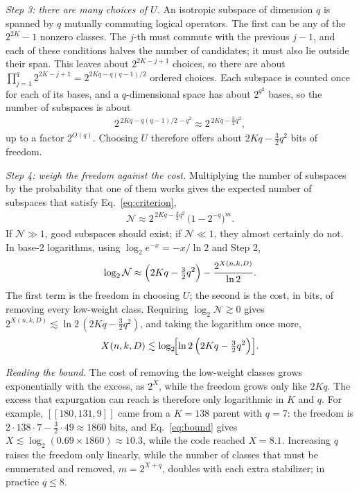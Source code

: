 \documentclass[reprint,pra,superscriptaddress,nofootinbib]{revtex4-2}
\begin{document}
\emph{Step 3: there are many choices of $U$.} An isotropic subspace of dimension $q$ is spanned by $q$ mutually
commuting logical operators. The first can be any of the $2^{2K}-1$ nonzero classes. The $j$-th must commute with the
previous $j-1$, and each of these conditions halves the number of candidates; it must also lie outside their span. This
leaves about $2^{2K-j+1}$ choices, so there are about $\prod_{j=1}^{q}2^{2K-j+1}=2^{2Kq-q(q-1)/2}$ ordered choices.
Each subspace is counted once for each of its bases, and a $q$-dimensional space has about $2^{q^2}$ bases, so the number
of subspaces is about
\begin{align}
2^{\,2Kq-q(q-1)/2-q^{2}}\approx2^{\,2Kq-\frac{3}{2}q^{2}},
\end{align}
up to a factor $2^{O(q)}$. Choosing $U$ therefore offers about $2Kq-\frac{3}{2}q^{2}$ bits of freedom.

\emph{Step 4: weigh the freedom against the cost.} Multiplying the number of subspaces by the probability that one of
them works gives the expected number of subspaces that satisfy Eq.~\eqref{eq:criterion},
\begin{align}
\mathcal{N}\approx 2^{\,2Kq-\frac{3}{2}q^{2}}\,\bigl(1-2^{-q}\bigr)^{m}.\label{eq:N}
\end{align}
If $\mathcal{N}\gg1$, good subspaces should exist; if $\mathcal{N}\ll1$, they almost certainly do not. In base-2 logarithms, using
$\log_2 e^{-x}=-x/\ln2$ and Step 2,
\begin{align}
\log_2\mathcal{N}\approx\Bigl(2Kq-\tfrac{3}{2}q^{2}\Bigr)-\frac{2^{X(n,k,D)}}{\ln2}.
\end{align}
The first term is the freedom in choosing $U$; the second is the cost, in bits, of removing every low-weight class.
Requiring $\log_2\mathcal{N}\gtrsim0$ gives $2^{X(n,k,D)}\lesssim\ln2\,(2Kq-\frac{3}{2}q^{2})$, and taking the
logarithm once more,
\begin{align}
X(n,k,D)\lesssim \log_2\!\Bigl[\ln 2\,\Bigl(2Kq-\tfrac{3}{2}q^{2}\Bigr)\Bigr].\label{eq:bound}
\end{align}

\emph{Reading the bound.} The cost of removing the low-weight classes grows exponentially with the excess, as
$2^{X}$, while the freedom grows only like $2Kq$. The excess that expurgation can reach is therefore only logarithmic in
$K$ and $q$. For example, $[[180,131,9]]$ came from a $K=138$ parent with $q=7$: the freedom is
$2\cdot138\cdot7-\frac{3}{2}\cdot49\approx1860$ bits, and Eq.~\eqref{eq:bound} gives $X\lesssim\log_2(0.69\times1860)
\approx10.3$, while the code reached $X=8.1$. Increasing $q$ raises the freedom only linearly, while the number of
classes that must be enumerated and removed, $m=2^{X+q}$, doubles with each extra stabilizer; in practice $q\le8$.
\end{document}
